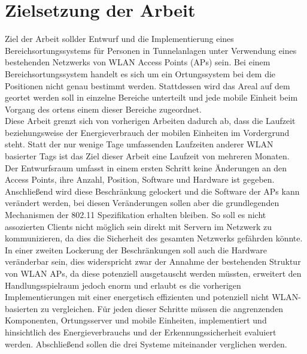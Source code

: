 \section{Zielsetzung der Arbeit}
\label{ch:Einleitung:sec:Zielsetzung}
Ziel der Arbeit sollder Entwurf und die Implementierung eines Bereichsortungssystems für Personen in Tunnelanlagen unter Verwendung eines bestehenden Netzwerks von WLAN Access Points (APs) sein. 
Bei einem Bereichsortungssystem handelt es sich um ein Ortungssystem bei dem die Positionen nicht genau bestimmt werden. Stattdessen wird das Areal auf dem geortet werden soll in einzelne Bereiche unterteilt und jede mobile Einheit beim Vorgang des ortens einem dieser Bereiche zugeordnet.\\
Diese Arbeit grenzt sich von vorherigen Arbeiten dadurch ab, dass die Laufzeit beziehungsweise der Energieverbrauch der mobilen Einheiten im Vordergrund steht. 
Statt der nur wenige Tage umfassenden Laufzeiten anderer WLAN basierter Tags ist das Ziel dieser Arbeit eine Laufzeit von mehreren Monaten. \\
Der Entwurfsraum umfasst in einem ersten Schritt keine Änderungen an den Access Points, ihre Anzahl, Position, Software und Hardware ist gegeben. 
Anschließend wird diese Beschränkung gelockert und die Software der APs kann verändert werden, bei diesen Veränderungen sollen aber die grundlegenden Mechanismen der 802.11 Spezifikation erhalten bleiben. 
So soll es nicht assozierten Clients nicht möglich sein direkt mit Servern im Netzwerk zu kommunizieren, da dies die Sicherheit des gesamten Netzwerks gefährden könnte.
In einer zweiten Lockerung der Beschränkungen soll auch die Hardware veränderbar sein, dies widerspricht zwar der Annahme der bestehenden Struktur von WLAN APs, da diese potenziell ausgetauscht werden müssten, erweitert den Handlungsspielraum jedoch enorm und erlaubt es die vorherigen Implementierungen mit einer energetisch effizienten und potenziell nicht WLAN-basierten zu vergleichen. 
Für jeden dieser Schritte müssen die angrenzenden Komponenten, Ortungsserver und mobile Einheiten, implementiert und hinsichtlich des Energieverbrauchs und der Erkennungssicherheit evaluiert werden. Abschließend sollen die drei Systeme miteinander verglichen werden. \\


